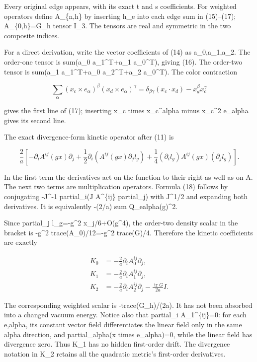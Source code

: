 \documentclass[
  11pt,
]{article}
\begin{document}
Every original edge appears, with its exact t and s coefficients. For
weighted operators define A\_\{n,h\} by inserting h\_e into each edge
sum in (15)--(17); A\_\{0,h\}=G\_h tensor I\_3. The tensors are real and
symmetric in the two composite indices.

For a direct derivation, write the vector coefficients of (14) as
a\_0,a\_1,a\_2. The order-one tensor is sum(a\_0 a\_1\^{}T+a\_1
a\_0\^{}T), giving (16). The order-two tensor is sum(a\_1 a\_1\^{}T+a\_0
a\_2\^{}T+a\_2 a\_0\^{}T). The color contraction

\[
 \sum_\alpha (x_c\times e_\alpha)^\beta
                 (x_d\times e_\alpha)^\gamma
 =\delta_{\beta\gamma}(x_c\cdot x_d)-x_d^\beta x_c^\gamma
\]

gives the first line of (17); inserting x\_c times x\_c\^{}alpha minus
\textbar x\_c\textbar\^{}2 e\_alpha gives its second line.

The exact divergence-form kinetic operator after (11) is

\[
 \frac2a\left[-\partial_i A^{ij}(gx)\partial_j
   +\frac12\partial_i(A^{ij}(gx)\partial_j l_g)
   +\frac14(\partial_i l_g)A^{ij}(gx)(\partial_j l_g)\right].
                                                               \tag{18}
\]

In the first term the derivatives act on the function to their right as
well as on A. The next two terms are multiplication operators. Formula
(18) follows by conjugating -J\^{}-1 partial\_i(J A\^{}\{ij\}
partial\_j) with J\^{}1/2 and expanding both derivatives. It is
equivalently -(2/a) sum Q\_ealpha(g)\^{}2.

Since partial\_j l\_g=-g\^{}2 x\_j/6+O(g\^{}4), the order-two density
scalar in the bracket is -g\^{}2 trace(A\_0)/12=-g\^{}2 trace(G)/4.
Therefore the kinetic coefficients are exactly

\[
 \begin{split}
 K_0&=-\frac2a\partial_i A_0^{ij}\partial_j,\\
 K_1&=-\frac2a\partial_i A_1^{ij}\partial_j,\\
 K_2&=-\frac2a\partial_i A_2^{ij}\partial_j
                       -\frac{\operatorname{tr}G}{2a}I.
 \end{split}                                                \tag{19}
\]

The corresponding weighted scalar is -trace(G\_h)/(2a). It has not been
absorbed into a changed vacuum energy. Notice also that partial\_i
A\_1\^{}\{ij\}=0: for each e,alpha, its constant vector field
differentiates the linear field only in the same alpha direction, and
partial\_alpha(x times e\_alpha)=0, while the linear field has
divergence zero. Thus K\_1 has no hidden first-order drift. The
divergence notation in K\_2 retains all the quadratic metric's
first-order derivatives.
\end{document}
